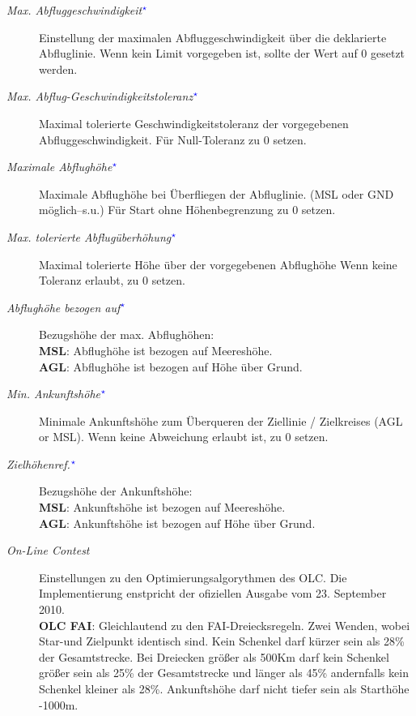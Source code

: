 \begin{description}
\item[\textit{Max. Abfluggeschwindigkeit$^{\textcolor{blue}{\star}}$}] Einstellung der maximalen Abfluggeschwindigkeit über die deklarierte Abfluglinie.
   Wenn kein Limit vorgegeben ist, sollte der Wert auf $0$ gesetzt werden.
\item[\textit{Max. Abflug-Geschwindigkeitstoleranz$^{\textcolor{blue}{\star}}$}] Maximal tolerierte Geschwindigkeitstoleranz der vorgegebenen Abfluggeschwindigkeit.
   Für Null-Toleranz zu $0$ setzen.
\item[\textit{Maximale Abflughöhe$^{\textcolor{blue}{\star}}$}]  Maximale Abflughöhe bei Überfliegen der Abfluglinie.
   (MSL oder GND möglich--s.u.) Für Start ohne Höhenbegrenzung zu $0$ setzen.
\item[\textit{Max. tolerierte Abflugüberhöhung$^{\textcolor{blue}{\star}}$}]  Maximal tolerierte Höhe über der vorgegebenen Abflughöhe
   Wenn keine Toleranz erlaubt, zu $0$ setzen.
\item[\textit{Abflughöhe bezogen auf$^{\textcolor{blue}{\star}}$}]  Bezugshöhe der max. Abflughöhen:\\
    {\bf MSL}: Abflughöhe ist bezogen auf Meereshöhe.\\
    {\bf AGL}: Abflughöhe ist bezogen auf Höhe über Grund.
\item[\textit{Min. Ankunftshöhe$^{\textcolor{blue}{\star}}$}]  Minimale Ankunftshöhe zum Überqueren der Ziellinie / Zielkreises
    (AGL or MSL). Wenn keine Abweichung erlaubt ist, zu $0$ setzen.
\item[\textit{Zielhöhenref.$^{\textcolor{blue}{\star}}$}] Bezugshöhe der Ankunftshöhe:\\
    {\bf MSL}: Ankunftshöhe ist bezogen auf Meereshöhe.\\
    {\bf AGL}: Ankunftshöhe ist bezogen auf Höhe über Grund.
\item[\textit{On-Line Contest}]  Einstellungen zu den Optimierungsalgorythmen des OLC.
   Die Implementierung enstpricht der ofiziellen Ausgabe vom 23. September 2010. \\
   {\bf OLC FAI}: Gleichlautend zu den FAI-Dreiecksregeln. Zwei Wenden, wobei Star-und Zielpunkt identisch sind.
   Kein Schenkel darf kürzer sein als 28\% der Gesamtstrecke. Bei Dreiecken größer als 500Km
   darf kein Schenkel größer sein als 25\% der Gesamtstrecke und länger als 45\% andernfalls kein
   Schenkel kleiner als 28\%. Ankunftshöhe darf nicht  tiefer sein als Starthöhe -1000m.\\

\end{description}

